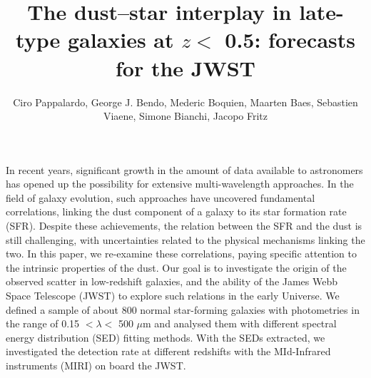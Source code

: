 \documentclass{aa}
\begin{document}
 

  \title{The dust--star interplay in late-type galaxies at $z <$ 0.5: forecasts for the JWST}
  \author{Ciro Pappalardo, George J. Bendo, Mederic Boquien, Maarten Baes, Sebastien Viaene, Simone Bianchi, Jacopo Fritz}
  \abstract
  {In recent years, significant growth in the amount of data available to astronomers has opened up the possibility for extensive multi-wavelength approaches. In the field of galaxy evolution, such approaches have uncovered fundamental correlations, linking the dust component of a galaxy to its star formation rate (SFR). Despite these achievements, the relation between the SFR and the dust is still challenging, with uncertainties related to the physical mechanisms linking the two.}
  {In this paper, we re-examine these correlations, paying specific attention to the intrinsic properties of the dust. Our goal is to investigate the origin of the observed scatter in low-redshift galaxies, and the ability of the James Webb Space Telescope (JWST) to explore such relations in the early Universe.}
  {We defined a sample of about 800 normal star-forming galaxies with photometries in the range of 0.15 $< \lambda <$ 500 $\mu$m and analysed them with different spectral energy distribution (SED) fitting methods. With the SEDs extracted, we investigated the detection rate at different redshifts with the MId-Infrared instruments (MIRI) on board the  JWST.}
\end{document}
